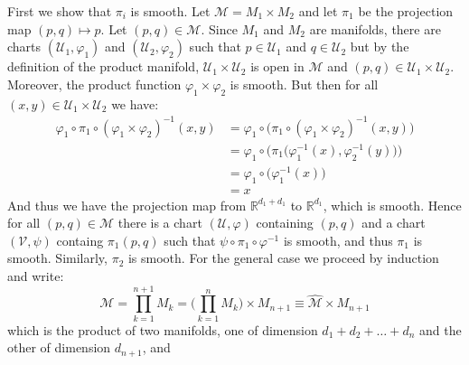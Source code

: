 \documentclass{article}                                                        %
\begin{document}
        \begin{solution}
            First we show that $\pi_{i}$ is smooth. Let
            $\mathcal{M}=M_{1}\times{M}_{2}$ and let $\pi_{1}$ be the projection
            map $(p,q)\mapsto{p}$. Let $(p,q)\in\mathcal{M}$. Since
            $M_{1}$ and $M_{2}$ are manifolds, there are charts
            $(\mathcal{U}_{1},\varphi_{1})$ and $(\mathcal{U}_{2},\varphi_{2})$
            such that $p\in\mathcal{U}_{1}$ and $q\in\mathcal{U}_{2}$ but by the
            definition of the product manifold,
            $\mathcal{U}_{1}\times\mathcal{U}_{2}$ is open in $\mathcal{M}$ and
            $(p,q)\in\mathcal{U}_{1}\times\mathcal{U}_{2}$. Moreover, the
            product function $\varphi_{1}\times\varphi_{2}$ is smooth. But then
            for all $(x,y)\in\mathcal{U}_{1}\times\mathcal{U}_{2}$ we have:
            \begin{align}
                \varphi_{1}\circ\pi_{1}\circ
                    (\varphi_{1}\times\varphi_{2})^{\minus{1}}(x,y)
                &=\varphi_{1}\circ\big(
                    \pi_{1}\circ(\varphi_{1}\times\varphi_{2})^{\minus{1}}(x,y)
                \big)\\
                &=\varphi_{1}\circ\Big(
                    \pi_{1}\big(\varphi_{1}^{\minus{1}}(x),
                                \varphi_{2}^{\minus{1}}(y)\big)\Big)\\
                &=\varphi_{1}\circ\big(\varphi_{1}^{\minus{1}}(x)\big)\\
                &=x
            \end{align}
            And thus we have the projection map from $\mathbb{R}^{d_{1}+d_{1}}$
            to $\mathbb{R}^{d_{1}}$, which is smooth. Hence for all
            $(p,q)\in\mathcal{M}$ there is a chart $(\mathcal{U},\varphi)$
            containing $(p,q)$ and a chart $(\mathcal{V},\psi)$ containg
            $\pi_{1}(p,q)$ such that $\psi\circ\pi_{1}\circ\varphi^{\minus{1}}$
            is smooth, and thus $\pi_{1}$ is smooth. Similarly, $\pi_{2}$ is
            smooth. For the general case we proceed by induction and write:
            \begin{equation}
                \mathcal{M}=\prod_{k=1}^{n+1}M_{k}=
                    \Big(\prod_{k=1}^{n}M_{k}\Big)\times{M}_{n+1}
                \equiv\widehat{\mathcal{M}}\times{M}_{n+1}
            \end{equation}
            which is the product of two manifolds, one of dimension
            $d_{1}+d_{2}+\dots+d_{n}$ and the other of dimension $d_{n+1}$, and

\end{solution}
\end{document}
